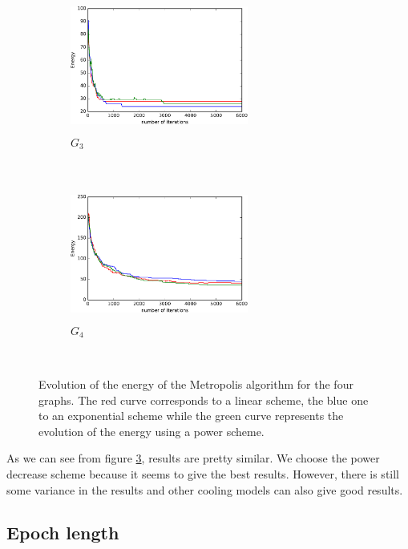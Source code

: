\documentclass[a4paper]{article}
\begin{document}
\begin{figure}[H]
    \begin{subfigure}[b]{0.45\textwidth}
        \includegraphics[width=2.3in, height=1.7in]{../Plots/SimulatedAnnealing/H_G3.pdf}
        \caption{$G_3$}
        \label{fig:g3}
    \end{subfigure}
    ~ %
    \begin{subfigure}[b]{0.45\textwidth}
        \includegraphics[width=2.3in, height=1.7in]{../Plots/SimulatedAnnealing/H_G4.pdf}
        \caption{$G_4$}
        \label{fig:g4}
    \end{subfigure}
    ~ %
    \caption{Evolution of the energy of the Metropolis algorithm for the four graphs. The red curve corresponds to a linear scheme, the blue one to an exponential scheme while the green curve represents the evolution of the energy using a power scheme.}
    \label{fig:comparison}
\end{figure}

As we can see from figure \ref{fig:comparison}, results are pretty similar. We choose the power decrease scheme because it seems to give the best results. However, there is still some variance in the results and other cooling models can also give good results.
\subsection{Epoch length}
\end{document}
